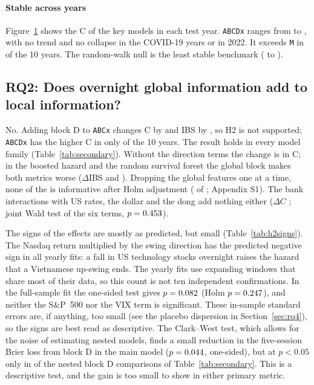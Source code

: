 \paragraph{Stable across years} Figure~\ref{fig:peryear} shows the C of the key models in each
test year. \texttt{ABCDx} ranges from \YearMinABCDx{} to \YearMaxABCDx, with no trend and no
collapse in the COVID-19 years or in 2022. It exceeds \texttt{M} in \YearsAboveABCDxM{} of the 10
years. The random-walk null is the least stable benchmark (\YearMinRW{} to \YearMaxRW).

\begin{figure}[!htbp]
\centering
{}
\caption{\FigTwoLegend}\label{fig:peryear}
\end{figure}

\subsection{RQ2: Does overnight global information add to local information?}\label{sec:rq2}

No. Adding block D to \texttt{ABCx} changes C by \PrimDCABCDxABCx{} and IBS by \PrimDIBSABCDxABCx,
so H2 is not supported; \texttt{ABCDx} has the higher C in only \YearsAboveABCDxABCx{} of the 10
years. The result holds in every model family (Table~\ref{tab:secondary}). Without the direction
terms the change is \DCABCDABC{} in C; in the boosted hazard and the random survival forest the
global block makes both metrics worse ($\Delta$IBS \DIBSGbmABCDGbmABC{} and \DIBSRsfABCDRsfABC).
Dropping the global features one at a time, none of the \AttribCount{} is informative after Holm
adjustment (\AttribInformative{} of \AttribCount; Appendix S1). The bank interactions with US
rates, the dollar and the dong add nothing either ($\Delta C$ \DCABCDxBankABCDx; joint Wald test
of the six terms, $p=0.453$).

The signs of the effects are mostly as predicted, but small (Table~\ref{tab:h2signs}). The Nasdaq
return multiplied by the swing direction has the predicted negative sign in all
\HTwoYearsNasdaqRetXdir{} yearly fits: a fall in US technology stocks overnight raises the hazard
that a Vietnamese up-swing ends. The yearly fits use expanding windows that share most of their
data, so this count is not ten independent confirmations. In the full-sample fit the one-sided test
gives $p=0.082$ (Holm $p=0.247$), and neither the S\&P~500 nor the
VIX term is significant. These in-sample standard errors are, if anything, too small (see the
placebo dispersion in Section~\ref{sec:rq4}), so the signs are best read as descriptive. The Clark--West test, which allows for the
noise of estimating nested models, finds a small reduction in the five-session Brier loss from
block D in the main model ($p=0.044$, one-sided), but at $p<0.05$ only in
\CWBlockDBelow{} of the \CWBlockDCount{} nested block D comparisons of Table~\ref{tab:secondary}.
This is a descriptive test, and the gain is too small to show in either primary metric.

